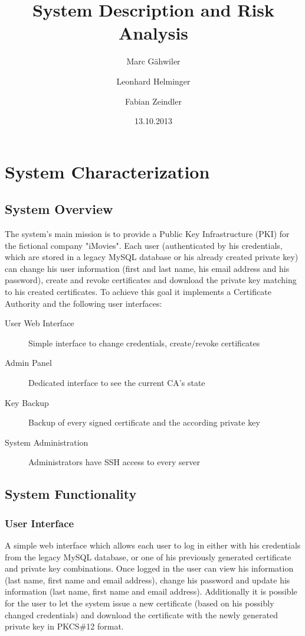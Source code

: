 \documentclass{article}
\title{\huge\sffamily\bfseries System Description and Risk Analysis}
\author{Marc G\"ahwiler \and Leonhard Helminger \and Fabian Zeindler}
\date{13.10.2013}
\begin{document}
\maketitle

\tableofcontents
\pagebreak


\section{System Characterization}

\subsection{System Overview}

The system's main mission is to provide a Public Key Infrastructure (PKI) for the fictional company "iMovies". Each user (authenticated by his credentials, which are stored in a legacy MySQL database or his already created private key) can change his user information (first and last name, his email address and his password), create and revoke certificates and download the private key matching to his created certificates. To achieve this goal it implements a Certificate Authority and the following user interfaces:

\begin{description}
\item[User Web Interface] Simple interface to change credentials, create/revoke certificates
\item[Admin Panel] Dedicated interface to see the current CA's state
\item[Key Backup] Backup of every signed certificate and the according private key
\item[System Administration] Administrators have SSH access to every server
\end{description}


\subsection{System Functionality}

\subsubsection{User Interface}

A simple web interface which allows each user to log in either with his credentials from the legacy MySQL database, or one of his previously generated certificate and private key combinations.
Once logged in the user can view his information (last name, first name and email address), change his password and update his information (last name, first name and email address).
Additionally it is possible for the user to let the system issue a new certificate (based on his possibly changed credentials) and download the certificate with the newly generated private key in PKCS\#12 format.
\end{document}
